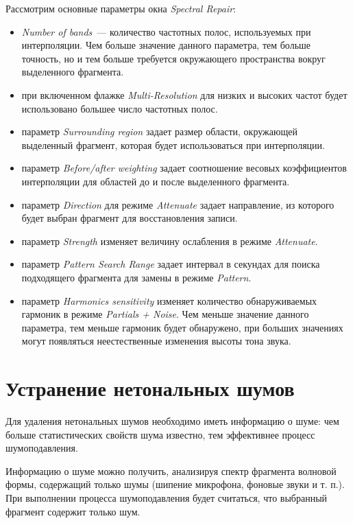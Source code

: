 \documentclass[oneside, final, 14pt]{extreport}
\begin{document}
Рассмотрим основные параметры окна \emph{Spectral Repair}:

\begin{itemize}
  \item \emph{Number of bands}~--- количество частотных полос, используемых при интерполяции. Чем больше значение данного параметра, тем больше точность, но и тем больше требуется окружающего пространства вокруг выделенного фрагмента.
  \item при включенном флажке \emph{Multi-Resolution} для низких и высоких частот будет использовано большее число частотных полос.
  \item параметр \emph{Surrounding region} задает размер области, окружающей выделенный фрагмент, которая будет использоваться при интерполяции.
  \item параметр \emph{Before/after weighting} задает соотношение весовых коэффициентов интерполяции для областей до и после выделенного фрагмента.
  \item параметр \emph{Direction} для режиме \emph{Attenuate} задает направление, из которого будет выбран фрагмент для восстановления записи.
  \item параметр \emph{Strength} изменяет величину ослабления в режиме \emph{Attenuate}.
  \item параметр \emph{Pattern Search Range} задает интервал в секундах для поиска подходящего фрагмента для замены в режиме \emph{Pattern}.
  \item параметр \emph{Harmonics sensitivity} изменяет количество обнаруживаемых гармоник в режиме \emph{Partials + Noise}. Чем меньше значение данного параметра, тем меньше гармоник будет обнаружено, при больших значениях могут появляться неестественные изменения высоты тона звука.
\end{itemize}


\section{Устранение нетональных шумов}
Для удаления нетональных шумов необходимо иметь информацию о шуме: чем больше статистических свойств шума известно, тем эффективнее процесс шумоподавления.

Информацию о шуме можно получить, анализируя спектр фрагмента волновой формы, содержащий только шумы (шипение микрофона, фоновые звуки и т. п.). При выполнении процесса шумоподавления будет считаться, что выбранный фрагмент содержит только шум.
\end{document}
